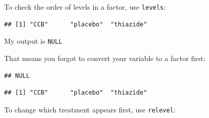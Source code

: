 \documentclass[
]{book}
\newenvironment{Shaded}{\begin{snugshade}}{\end{snugshade}}
\newcommand{\CommentTok}[1]{\textcolor[rgb]{0.56,0.35,0.01}{\textit{#1}}}
\newcommand{\FunctionTok}[1]{\textcolor[rgb]{0.00,0.00,0.00}{#1}}
\newcommand{\NormalTok}[1]{#1}
\newcommand{\OtherTok}[1]{\textcolor[rgb]{0.56,0.35,0.01}{#1}}
\newcommand{\SpecialCharTok}[1]{\textcolor[rgb]{0.00,0.00,0.00}{#1}}
\newcommand{\StringTok}[1]{\textcolor[rgb]{0.31,0.60,0.02}{#1}}
\begin{document}
To check the order of levels in a factor, use \texttt{levels}:

\begin{Shaded}
\end{Shaded}

\begin{verbatim}
## [1] "CCB"      "placebo"  "thiazide"
\end{verbatim}

My output is \texttt{NULL}

That means you forgot to convert your variable to a factor first:

\begin{Shaded}
\end{Shaded}

\begin{verbatim}
## NULL
\end{verbatim}

\begin{Shaded}
\end{Shaded}

\begin{verbatim}
## [1] "CCB"      "placebo"  "thiazide"
\end{verbatim}

To change which treatment appears first, use \texttt{relevel}:

\begin{Shaded}
\end{Shaded}
\end{document}
